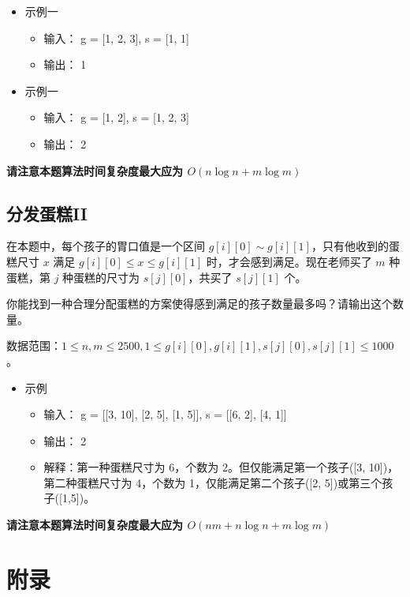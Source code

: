 \documentclass[12pt,a4paper]{article}
\begin{document}
\begin{itemize} [noitemsep]
    \item 示例一
          \begin{itemize}[noitemsep]
              \item[] 输入： g = [1, 2, 3], s = [1, 1]
              \item[] 输出： 1
          \end{itemize}
    \item 示例一
          \begin{itemize}[noitemsep]
              \item[] 输入： g = [1, 2], s = [1, 2, 3]
              \item[] 输出： 2
          \end{itemize}
\end{itemize}

\textbf{请注意本题算法时间复杂度最大应为 $O(n\log n + m\log m)$}

\subsection{分发蛋糕II}

在本题中，每个孩子的胃口值是一个区间 $g[i][0]\sim g[i][1]$，只有他收到的蛋糕尺寸 $x$ 满足 $g[i][0] \le x \le g[i][1]$ 时，才会感到满足。现在老师买了 $m$ 种蛋糕，第 $j$ 种蛋糕的尺寸为 $s[j][0]$，共买了 $s[j][1]$ 个。

你能找到一种合理分配蛋糕的方案使得感到满足的孩子数量最多吗？请输出这个数量。

数据范围：$1\le n, m \le 2500, 1\le g[i][0], g[i][1], s[j][0], s[j][1] \le 1000$。

\begin{itemize} [noitemsep]
    \item 示例
          \begin{itemize}[noitemsep]
              \item[] 输入： g = [[3, 10], [2, 5], [1, 5]], s = [[6, 2], [4, 1]]
              \item[] 输出： 2
              \item[] \small 解释：第一种蛋糕尺寸为 6，个数为 2。但仅能满足第一个孩子([3, 10])，第二种蛋糕尺寸为 4，个数为 1，仅能满足第二个孩子([2, 5])或第三个孩子([1,5])。
          \end{itemize}
\end{itemize}


\textbf{请注意本题算法时间复杂度最大应为 $O(nm + n\log n + m\log m)$}


\section{附录}
\end{document}
